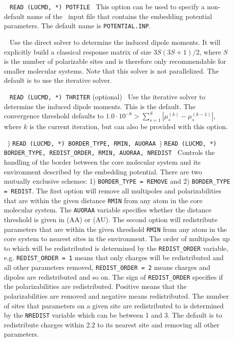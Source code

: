 \begin{description}

\item[]\verb| |\newline
\verb|READ (LUCMD, *) POTFILE|\verb| |\newline
This option can be used to specify a non-default name of the \potinp\ input file that contains the embedding potential parameters. The default name is \verb|POTENTIAL.INP|.

\item[]\verb| |\newline
Use the direct solver to determine the induced dipole moments. It will explicitly build a classical response matrix of size $3S(3S+1)/2$, where $S$ is the number of polarizable sites and is therefore only recommendable for smaller molecular systems. Note that this solver is not parallelized. The default is to use the iterative solver.

\item[]\verb| |\newline
\verb|READ (LUCMD, *) THRITER| (optional)\verb| |\newline
Use the iterative solver to determine the induced dipole moments. This is the default. The convergence threshold defaults to $1.0\cdot10^{-8} > \sum_{s=1}^{S}|\mu_s^{(k)} - \mu_s^{(k-1)}|$, where $k$ is the current iteration, but can also be provided with this option.

\item[]\verb| |) \verb|READ (LUCMD, *) BORDER_TYPE, RMIN, AUORAA|\verb| |) \verb|READ (LUCMD, *) BORDER_TYPE, REDIST_ORDER, RMIN, AUORAA, NREDIST|\verb| |\newline
Controls the handling of the border between the core molecular system
and its environment described by the embedding potential. There are
two mutually exclusive schemes: 1) \verb|BORDER_TYPE = REMOVE| and 2)
\verb|BORDER_TYPE = REDIST|. The first option will remove all
multipoles and polarizabilities that are within the given distance
\verb|RMIN| from any atom in the core molecular system. The
\verb|AUORAA| variable specifies whether the distance threshold is
given in \angstrom{} (AA) or \bohr{} (AU). The second option will
redistribute parameters that are within the given threshold
\verb|RMIN| from any atom in the core system to nearest sites in the
environment. The order of multipoles up to which will be redistributed
is determined by the \verb|REDIST_ORDER| variable,
e.g. \verb|REDIST_ORDER = 1| means that only charges will be
redistributed and all other parameters removed,
\verb|REDIST_ORDER = 2| means charges and dipoles are redistributed
and so on. The sign of \verb|REDIST_ORDER| specifies if the
polarizabilities are redistributed. Positive means that the
polarizabilities are removed and negative means redistributed. The
number of sites that parameters on a given site are redistributed to
is determined by the \verb|NREDIST| variable which can be between 1
and 3. The default is to redistribute charges within 2.2 \bohr{} to its
nearest site and removing all other parameters.


\end{description}
